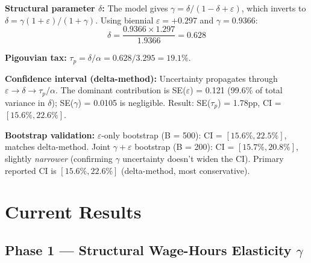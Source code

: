 \documentclass[11pt, letterpaper]{article}
\begin{document}
\textbf{Structural parameter $\delta$:} The model gives $\gamma = \delta/(1 - \delta + \varepsilon)$, which inverts to $\delta = \gamma(1+\varepsilon)/(1+\gamma)$. Using biennial $\varepsilon = +0.297$ and $\gamma = 0.9366$:
$$\delta = \frac{0.9366 \times 1.297}{1.9366} = 0.628$$

\textbf{Pigouvian tax:} $\tau_p = \delta/\alpha = 0.628/3.295 = 19.1\%$.

\textbf{Confidence interval (delta-method):} Uncertainty propagates through $\varepsilon \to \delta \to \tau_p/\alpha$. The dominant contribution is SE($\varepsilon$) = 0.121 (99.6\% of total variance in $\delta$); SE($\gamma$) = 0.0105 is negligible. Result: SE($\tau_p$) = 1.78pp, CI = $[15.6\%, 22.6\%]$.

\textbf{Bootstrap validation:} $\varepsilon$-only bootstrap (B = 500): CI = $[15.6\%, 22.5\%]$, matches delta-method. Joint $\gamma + \varepsilon$ bootstrap (B = 200): CI = $[15.7\%, 20.8\%]$, slightly \textit{narrower} (confirming $\gamma$ uncertainty doesn't widen the CI). Primary reported CI is $[15.6\%, 22.6\%]$ (delta-method, most conservative).

\newpage
\section{Current Results}

\subsection{Phase 1 --- Structural Wage-Hours Elasticity $\gamma$}
\end{document}
